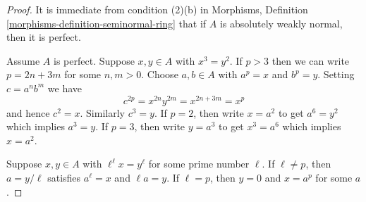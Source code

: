 \documentclass[10pt,a4paper]{amsart}
\theoremstyle{plain}
\theoremstyle{definition}
\theoremstyle{remark}
\numberwithin{equation}{subsection}
\begin{document}
\begin{proof}
It is immediate from condition (2)(b) in
Morphisms, Definition \ref{morphisms-definition-seminormal-ring}
that if $A$ is absolutely weakly normal, then it is perfect.

\medskip\noindent
Assume $A$ is perfect. Suppose $x, y \in A$ with $x^3 = y^2$.
If $p > 3$ then we can write $p = 2n + 3m$ for some $n, m > 0$.
Choose $a, b \in A$ with $a^p = x$ and $b^p = y$.
Setting $c = a^n b^m$ we have
$$
c^{2p} = x^{2n} y^{2m} = x^{2n + 3m} = x^p
$$
and hence $c^2 = x$. Similarly $c^3 = y$. If $p = 2$, then
write $x = a^2$ to get $a^6 = y^2$ which implies $a^3 = y$.
If $p = 3$, then write $y = a^3$ to get $x^3 = a^6$ which
implies $x = a^2$.

\medskip\noindent
Suppose $x, y \in A$ with $\ell^\ell x = y^\ell$ for some prime
number $\ell$. If $\ell \not = p$, then $a = y/\ell$ satisfies
$a^\ell = x$ and $\ell a = y$. If $\ell = p$, then
$y = 0$ and $x = a^p$ for some $a$.
\end{proof}
\end{document}
